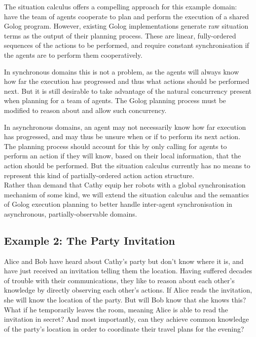 The situation calculus offers a compelling approach for this example
domain: have the team of agents cooperate to plan and perform the
execution of a shared Golog program. However, existing Golog implementations
generate raw situation terms as the output of their planning process.
These are linear, fully-ordered sequences of the actions to be performed,
and require constant synchronisation if the agents are to perform
them cooperatively.

In synchronous domains this is not a problem, as the agents will always
know how far the execution has progressed and thus what actions should
be performed next. But it is still desirable to take advantage of
the natural concurrency present when planning for a team of agents.
The Golog planning process must be modified to reason about and allow
such concurrency.

In asynchronous domains, an agent may not necessarily know how far
execution has progressed, and may thus be unsure when or if to perform
its next action. The planning process should account for this by only
calling for agents to perform an action if they will know, based on
their local information, that the action should be performed. But
the situation calculus currently has no means to represent this kind
of partially-ordered action action structure.\\


Rather than demand that Cathy equip her robots with a global synchronisation
mechanism of some kind, we will extend the situation calculus and
the semantics of Golog execution planning to better handle inter-agent
synchronisation in asynchronous, partially-observable domains.


\subsection*{Example 2: The Party Invitation}

Alice and Bob have heard about Cathy's party but don't know where
it is, and have just received an invitation telling them the location.
Having suffered decades of trouble with their communications, they
like to reason about each other's knowledge by directly observing
each other's actions. If Alice reads the invitation, she will know
the location of the party. But will Bob know that she knows this?
What if he temporarily leaves the room, meaning Alice is able to read
the invitation in secret? And most importantly, can they achieve common
knowledge of the party's location in order to coordinate their travel
plans for the evening?\\


